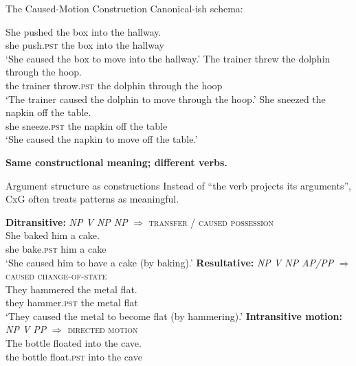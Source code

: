 \begin{frame}{The Caused-Motion Construction}
\small
Canonical-ish schema:
 \label{ex:causedmotion}
\begin{exe}
  \ex \gll She pushed the box into the hallway.\\
      she push.\textsc{pst} the box into the hallway\\
      \glt `She caused the box to move into the hallway.'
  \ex \gll The trainer threw the dolphin through the hoop.\\
      the trainer throw.\textsc{pst} the dolphin through the hoop\\
      \glt `The trainer caused the dolphin to move through the hoop.'
  \ex \gll She sneezed the napkin off the table.\\
      she sneeze.\textsc{pst} the napkin off the table\\
      \glt `She caused the napkin to move off the table.'
\end{exe}


\vspace{0.5em}
\textbf{Same constructional meaning; different verbs.}
\end{frame}

\begin{frame}{Argument structure as constructions}
\small
Instead of ``the verb projects its arguments'', CxG often treats patterns as meaningful.


\begin{exe}
  \ex \textbf{Ditransitive:} \emph{NP V NP NP} $\Rightarrow$ \textsc{transfer} / \textsc{caused possession}\\
      \gll She baked him a cake.\\
          she bake.\textsc{pst} him a cake\\
      \glt `She caused him to have a cake (by baking).'
  \ex \textbf{Resultative:} \emph{NP V NP AP/PP} $\Rightarrow$ \textsc{caused change-of-state}\\
      \gll They hammered the metal flat.\\
          they hammer.\textsc{pst} the metal flat\\
      \glt `They caused the metal to become flat (by hammering).'
  \ex \textbf{Intransitive motion:} \emph{NP V PP} $\Rightarrow$ \textsc{directed motion}\\
      \gll The bottle floated into the cave.\\
          the bottle float.\textsc{pst} into the cave\\
\end{exe}

\end{frame}

